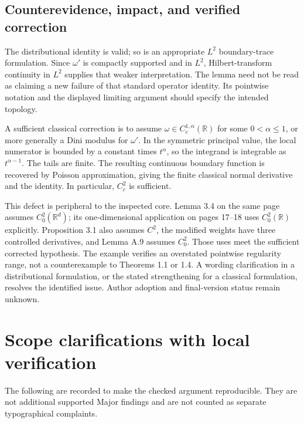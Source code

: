 \documentclass[10pt]{article}
\begin{document}
\subsection*{Counterevidence, impact, and verified correction}
The distributional identity is valid; so is an appropriate \(L^2\) boundary-trace formulation. Since \(\omega'\) is compactly supported and in \(L^2\), Hilbert-transform continuity in \(L^2\) supplies that weaker interpretation. The lemma need not be read as claiming a new failure of that standard operator identity. Its pointwise notation and the displayed limiting argument should specify the intended topology.\par
A sufficient classical correction is to assume \(\omega\in C_c^{1,\alpha}(\mathbb R)\) for some \(0<\alpha\leq1\), or more generally a Dini modulus for \(\omega'\). In the symmetric principal value, the local numerator is bounded by a constant times \(t^\alpha\), so the integrand is integrable as \(t^{\alpha-1}\). The tails are finite. The resulting continuous boundary function is recovered by Poisson approximation, giving the finite classical normal derivative and the identity. In particular, \(C_c^2\) is sufficient.\par
This defect is peripheral to the inspected core. Lemma 3.4 on the same page assumes \(C^2_0(\mathbb R^d)\); its one-dimensional application on pages 17–18 uses \(C^2_0(\mathbb R)\) explicitly. Proposition 3.1 also assumes \(C^2\), the modified weights have three controlled derivatives, and Lemma A.9 assumes \(C^2_0\). Those uses meet the sufficient corrected hypothesis. The example verifies an overstated pointwise regularity range, not a counterexample to Theorems 1.1 or 1.4. A wording clarification in a distributional formulation, or the stated strengthening for a classical formulation, resolves the identified issue. Author adoption and final-version status remain unknown.\par
\section*{Scope clarifications with local verification}
The following are recorded to make the checked argument reproducible. They are not additional supported Major findings and are not counted as separate typographical complaints.\par
\end{document}
